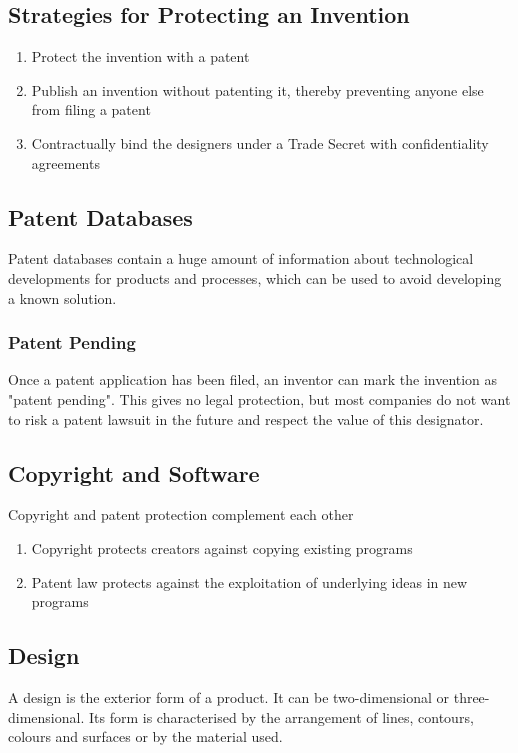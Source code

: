 \documentclass[11pt]{article}
\theoremstyle{definition}
\begin{document}
\subsection{Strategies for Protecting an Invention}
\begin{enumerate}
	\item Protect the invention with a patent
	\item Publish an invention  without patenting it, thereby preventing anyone else from filing a patent
	\item Contractually bind the designers under a Trade Secret with confidentiality agreements
\end{enumerate}

\subsection{Patent Databases}
Patent databases contain a huge amount of information about technological developments for products and processes, which can be used to avoid developing a known solution.

\subsubsection{Patent Pending}
Once a patent application has been filed, an inventor can mark the invention as "patent pending". This gives no legal protection, but most companies do not want to risk a patent lawsuit in the future and respect the value of this designator.

\subsection{Copyright and Software}
Copyright and patent protection complement each other
\begin{enumerate}
	\item Copyright protects creators against copying existing programs
	\item Patent law protects against the exploitation of underlying ideas in new programs
\end{enumerate}

\subsection{Design}
A design is the exterior form of a product. It can be two-dimensional or three-dimensional. Its form is characterised by the arrangement of lines, contours, colours and surfaces or by the material used.
\end{document}
